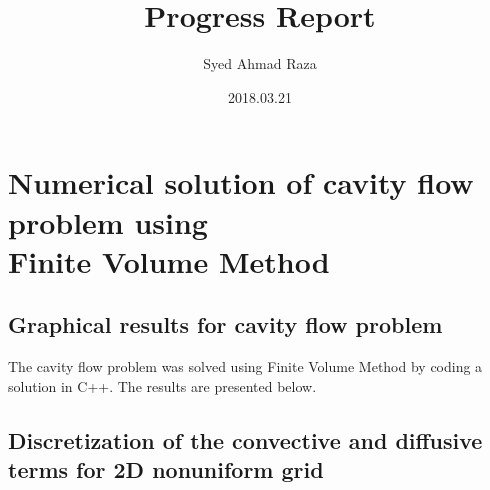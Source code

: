\documentclass[12pt,a4paper,fleqn]{article}
\title{Progress Report}
\author{Syed Ahmad Raza}
\date{2018.03.21}
\begin{document}
\maketitle
\pagebreak

\section{Numerical solution of cavity flow problem using\\
    Finite Volume Method}

\subsection{Graphical results for cavity flow problem}

The cavity flow problem was solved using Finite Volume Method by coding a solution in C++. The results are presented below.

\begin{figure}[H]
    \centering
    \label{fig:n,xy=40_qk_cavityFlowY.eps}
\end{figure}

\begin{figure}[H]
    \centering
    \label{fig:n,xy=40_qk_cavityFlowX.eps}
\end{figure}

\begin{figure}[H]
    \centering
    \label{fig:n,xy=40_qk_uContours.eps}
\end{figure}

\begin{figure}[H]
    \centering
    \label{fig:n,xy=40_qk_vContours.eps}
\end{figure}

\begin{figure}[H]
    \centering
    \label{fig:n,xy=40_qk_velVectors.eps}
\end{figure}

\subsection{Discretization of the convective and diffusive terms for 2D nonuniform grid}
\end{document}
